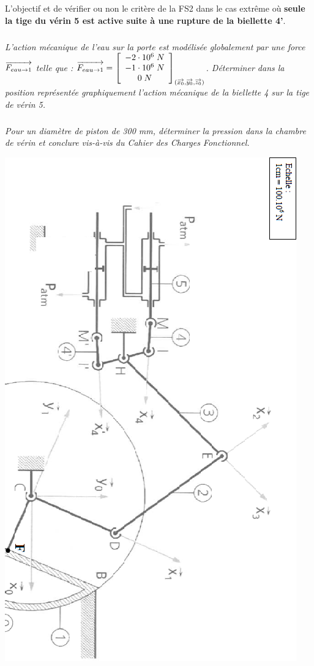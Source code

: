 \documentclass[10pt]{article}
\begin{document}
L'objectif et de vérifier ou non le critère de la FS2 dans le cas extrême où \textbf{seule la tige du vérin 5 est active suite à une rupture de la biellette 4'}.

\subparagraph{} 
\textit{L'action mécanique de l'eau sur la porte est modélisée globalement par une force $\overrightarrow{F_{eau\rightarrow 1}}$ telle que : $\overrightarrow{F_{eau\rightarrow 1}}=\left[\begin{array}{c}
-2\cdot10^{6}\; N \\
-1\cdot10^{6}\; N \\ 
0\; N 
\end{array}\right]_{(\overrightarrow{x_0},\overrightarrow{y_0},\overrightarrow{z_0})}$. Déterminer dans la position représentée graphiquement l'action mécanique de la biellette 4 sur la tige de vérin 5.}

\subparagraph{} 
\textit{Pour un diamètre de piston de 300\; mm, déterminer la pression dans la chambre de vérin et conclure vis-à-vis du Cahier des Charges Fonctionnel.}


\begin{center}
\includegraphics[height=.9\textheight]{images/img6.png}
\end{center}
\end{document}
